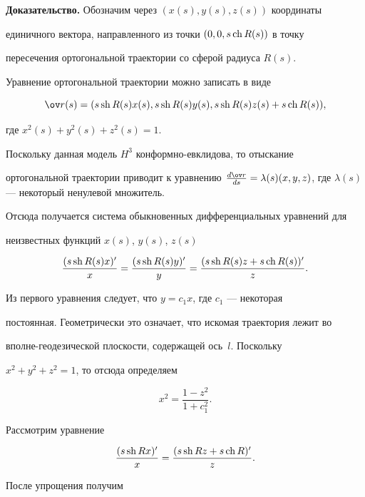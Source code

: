 {\bf Доказательство.} Обозначим через $(x(s),y(s),z(s))$ координаты


единичного вектора, направленного из точки $(0,0,s \operatorname{ch} R(s))$ в точку


пересечения ортогональной траектории со сферой радиуса $R(s)$.


Уравнение ортогональной траектории можно записать в виде


$$


\ov r(s)=(s \sh R(s)x(s),s \sh R(s)y(s),s \sh R(s)z(s)+s \ch R(s)),


$$


где $x^2(s)+y^2(s)+z^2(s)=1$.


Поскольку данная модель $H^3$ конформно-евклидова, то отыскание


ортогональной траектории приводит к уравнению $\frac{d\ov r}{ds}


=\lambda (s)(x,y,z)$, где $\lambda (s)$ --- некоторый ненулевой множитель.


Отсюда получается система обыкновенных дифференциальных уравнений для


неизвестных функций $x(s)$, $y(s)$, $z(s)$


$$


\frac{(s \sh R(s)x)'}{x}=\frac{(s \sh R(s)y)'}{y}=


\frac{(s \sh R(s)z+s \ch R(s))'}{z}.


$$


Из первого уравнения следует, что $y=c_1x$, где $c_1$ --- некоторая


постоянная. Геометрически это означает, что искомая траектория лежит во


вполне-геодезической плоскости, содержащей ось~$l$. Поскольку


$x^2+y^2+z^2=1$, то отсюда определяем


\begin{equation}


x^2= \frac{1-z^2}{1+c_1^2}.


\end{equation}





Рассмотрим уравнение


\begin{equation}


\frac{(s \sh Rx)'}{x}= \frac{(s \sh Rz+s \ch R)'}{z}.


\end{equation}


После упрощения получим


